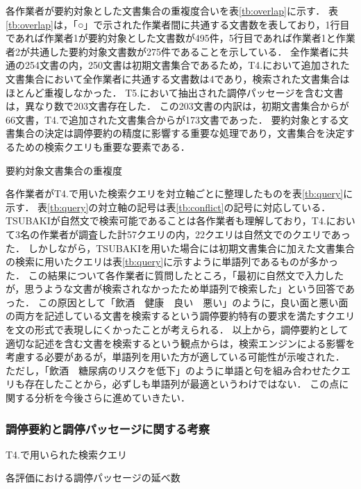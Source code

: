 \documentclass[japanese]{jnlp_1.4}
\begin{document}
{各}作業者が要約対象とした文書集合の重複度合いを{表}\ref{tb:overlap}に示す．
表\ref{tb:overlap}は，「○」で示された作業者間に共通する文書数を表しており，1行目であれば作業者1が要約対象とした文書数が495件，5行目であれば作業者1と作業者2が共通した要約対象文書数が275件であることを示している．
全作業者に共通の254文書の内，250文書は初期文書集合であるため，T4.において追加された文書集合において全作業者に共通する文書数は4であり，検索された文書集合はほとんど重複しなかった．
T5.において抽出された調停パッセージを含む文書は，異なり数で203文書存在した．
この203文書の内訳は，初期文書集合からが66文書，T4.で追加された文書集合からが173文書であった．
要約対象とする文書集合の決定は調停要約の精度に影響する重要な処理であり，文書集合を決定するための検索クエリも重要な要素である．

\begin{table}[t]
 \caption{要約対象文書集合の重複度}
 \label{tb:overlap}

\end{table}

各作業者がT4.で用いた検索クエリを対立軸ごとに整理したものを表\ref{tb:query}に示す．
表\ref{tb:query}の対立軸の記号は表\ref{tb:conflict}の記号に対応している．
TSUBAKIが自然文で検索可能であることは各作業者も理解しており，T4.において3名の作業者が調査した計57クエリの内，22クエリは自然文でのクエリであった．
しかしながら，TSUBAKIを用いた場合には初期文書集合に加えた文書集合の検索に用いたクエリは表\ref{tb:query}に示すように単語列であるものが多かった．
この結果について各作業者に質問したところ，「最初に自然文で入力したが，思うような文書が検索されなかったため単語列で検索した」という回答であった．
この原因として「飲酒　健康　良い　悪い」のように，良い面と悪い面の両方を記述している文書を検索するという調停要約特有の要求を満たすクエリを文の形式で表現しにくかったことが考えられる．
以上から，調停要約として適切な記述を含む文書を検索するという観点からは，検索エンジンによる影響を考慮する必要があるが，単語列を用いた方が適している可能性が示唆された．
ただし，「飲酒　糖尿病のリスクを低下」のように単語と句を組み合わせたクエリも存在したことから，必ずしも単語列が最適というわけではない．
この点に関する分析を今後さらに進めていきたい．


\subsubsection{調停要約と調停パッセージに関する考察}

\begin{table}[t]
 \caption{T4.で用いられた検索クエリ}
 \label{tb:query}

\end{table}
\begin{table}[t]
 \caption{各評価における調停パッセージの延べ数}
 \label{tb:evaluation}

\end{table}
\end{document}
